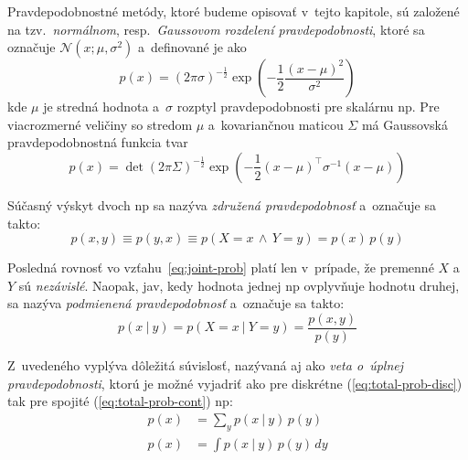       Pravdepodobnostné metódy, ktoré budeme opisovať v~tejto kapitole, sú založené na tzv.\ \emph{normálnom}, resp.\ \emph{Gaussovom rozdelení pravdepodobnosti}, ktoré sa označuje $\mathcal{N}(x;\mu,\sigma^2)$ a~definované je ako
      \begin{equation}
        p(x) = {(2 \pi \sigma)}^{-\frac{1}{2}} \exp \left( -\frac{1}{2} \frac{{(x-\mu)}^2}{\sigma^2} \right)
      \end{equation}
      kde $\mu$ je stredná hodnota a~$\sigma$ rozptyl pravdepodobnosti pre skalárnu \acrshort{np}. Pre viacrozmerné veličiny so stredom $\mu$ a~kovariančnou maticou $\Sigma$ má Gaussovská pravdepodobnostná funkcia tvar
      \begin{equation}
        p(x) = \det {(2 \pi \Sigma)}^{-\frac{1}{2}} \exp \left( -\frac{1}{2} {(x-\mu)}^{\top} \sigma^{-1} (x - \mu) \right)
        \label{eq:normal-dist}
      \end{equation}

      Súčasný výskyt dvoch \acrshort{np} sa nazýva \emph{združená pravdepodobnosť} a~označuje sa takto:
      \begin{equation}
        p(x,y) \equiv p(y,x) \equiv p(X = x\, \land\, Y = y) = p(x)\, p(y)
        \label{eq:joint-prob}
      \end{equation}

      Posledná rovnosť vo vzťahu~\ref{eq:joint-prob} platí len v~prípade, že premenné $X$ a~$Y$ sú \emph{nezávislé}. Naopak, jav, kedy hodnota jednej \acrshort{np} ovplyvňuje hodnotu druhej, sa nazýva \emph{podmienená pravdepodobnosť} a~označuje sa takto:
      \begin{equation}
        p(x\ |\ y) = p(X = x\ |\ Y = y) = \frac{p(x,y)}{p(y)}
        \label{eq:cond-prob}
      \end{equation}

      Z~uvedeného vyplýva dôležitá súvislosť, nazývaná aj ako \emph{veta o~úplnej pravdepodobnosti}, ktorú je možné vyjadriť ako pre diskrétne (\ref{eq:total-prob-disc}) tak pre spojité (\ref{eq:total-prob-cont}) \acrshort{np}:
      \begin{subequations}
        \begin{align}
          p(x) &= \sum_y p(x\ |\ y)\, p(y) \label{eq:total-prob-disc} \\
          p(x) &= \int p(x\ |\ y)\, p(y)\, dy
          \label{eq:total-prob-cont}
        \end{align}\label{eq:total-prob}
      \end{subequations}

